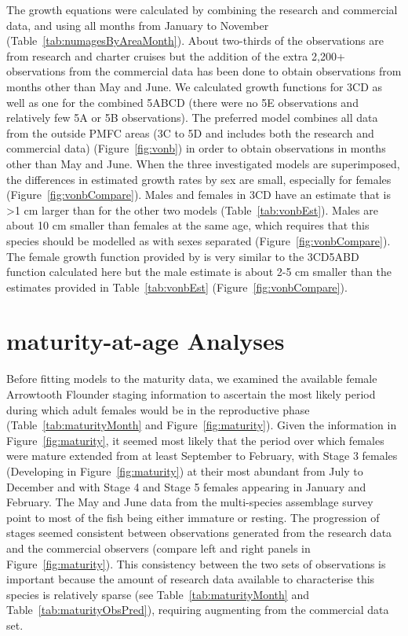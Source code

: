 The growth equations were calculated by combining the research and commercial data, and using all months from January to November (Table~\ref{tab:numagesByAreaMonth}). About two-thirds of the observations are from research and charter cruises but the addition of the extra 2,200+ observations from the commercial data has been done to obtain observations from months other than May and June. We calculated growth functions for 3CD as well as one for the combined 5ABCD (there were no 5E observations and relatively few 5A or 5B observations). The preferred model combines all data from the outside PMFC areas (3C to 5D and includes both the research and commercial data) (Figure~\ref{fig:vonb}) in order to obtain observations in months other than May and June. When the three investigated models are superimposed, the differences in estimated growth rates by sex are small, especially for females (Figure~\ref{fig:vonbCompare}). Males and females in 3CD have an  estimate that is \textgreater1 cm larger than for the other two models (Table~\ref{tab:vonbEst}). Males are about 10 cm smaller than females at the same age, which requires that this species should be modelled as with sexes separated (Figure~\ref{fig:vonbCompare}). The female growth function provided by \citet{arf2001} is very similar to the 3CD5ABD function calculated here but the male estimate is about 2-5 cm smaller than the estimates provided in Table~\ref{tab:vonbEst} (Figure~\ref{fig:vonbCompare}).

\section{maturity-at-age Analyses}

Before fitting models to the maturity data, we examined the available female Arrowtooth Flounder staging information to ascertain the most likely period during which adult females would be in the reproductive phase (Table~\ref{tab:maturityMonth} and Figure~\ref{fig:maturity}). Given the information in Figure~\ref{fig:maturity}, it seemed most likely that the period over which females were mature extended from at least September to February, with Stage 3 females (Developing in Figure~\ref{fig:maturity}) at their most abundant from July to December and with Stage 4 and Stage 5 females appearing in January and February. The May and June data from the multi-species assemblage survey point to most of the fish being either immature or resting.  The progression of stages seemed consistent between observations generated from the research data and the commercial observers (compare left and right panels in Figure~\ref{fig:maturity}). This consistency between the two sets of observations is important because the amount of research data available to characterise this species is relatively sparse (see Table~\ref{tab:maturityMonth} and Table~\ref{tab:maturityObsPred}), requiring augmenting from the commercial data set.

